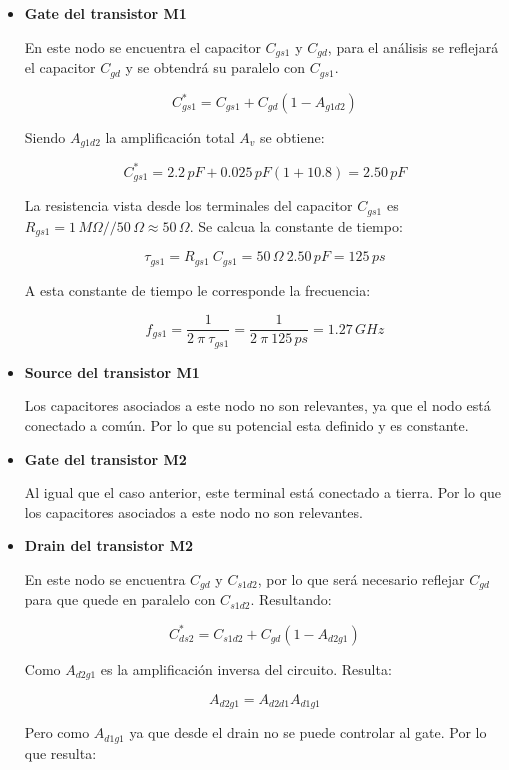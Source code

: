 \documentclass[10pt,spanish,a4paper,notitlepage]{article}
\begin{document}
\begin{itemize}
\item \textbf{Gate del transistor M1}

En este nodo se encuentra el capacitor $C_{gs1}$ y $C_{gd}$, para
el análisis se reflejará el capacitor $C_{gd}$ y se obtendrá su paralelo
con $C_{gs1}$.

\[ \displaystyle C_{gs1}^* = C_{gs1} + C_{gd} (1-A_{g1d2}) \]

Siendo $A_{g1d2}$ la amplificación total $A_v$ se obtiene:

\[ \displaystyle C_{gs1}^* = 2.2\,\unit{pF} + 0.025\,\unit{pF} (1+10.8) = 2.50\,\unit{pF} \]

La resistencia vista desde los terminales del capacitor $C_{gs1}$ es 
$R_{gs1} = 1\,\unit{M\Omega} // 50\,\unit{\Omega} \approx 50\,\unit{\Omega}$.
Se calcua la constante de tiempo:

\[ \displaystyle \tau_{gs1} = R_{gs1}\ C_{gs1} =  50\,\unit{\Omega}\ 2.50\,\unit{pF} =
125\,\unit{ps}\]

A esta constante de tiempo le corresponde la frecuencia:

\[ \displaystyle f_{gs1} = \frac{1}{2\ \pi \ \tau_{gs1}} =
\frac{1}{2\ \pi \ 125 \,\unit{ps}} = 1.27\,\unit{GHz} \]

\item \textbf{Source del transistor M1}

Los capacitores asociados a este nodo no son relevantes, ya que el nodo está
conectado a común. Por lo que su potencial esta definido y es constante.

\item \textbf{Gate del transistor M2}

Al igual que el caso anterior, este terminal está conectado a tierra. Por
lo que los capacitores asociados a este nodo no son relevantes.

\item \textbf{Drain del transistor M2}

En este nodo se encuentra $C_{gd}$ y $C_{s1d2}$, por lo que será necesario
reflejar $C_{gd}$ para que quede en paralelo con $C_{s1d2}$. Resultando:

\[ \displaystyle C_{ds2}^* = C_{s1d2} + C_{gd} (1 - A_{d2g1}) \]

Como $A_{d2g1}$ es la amplificación inversa del circuito. Resulta:

\[ \displaystyle A_{d2g1} = A_{d2d1} A_{d1g1} \]

Pero como $A_{d1g1}$ ya que desde el drain no se puede controlar al gate.
Por lo que resulta:


\end{itemize}
\end{document}
